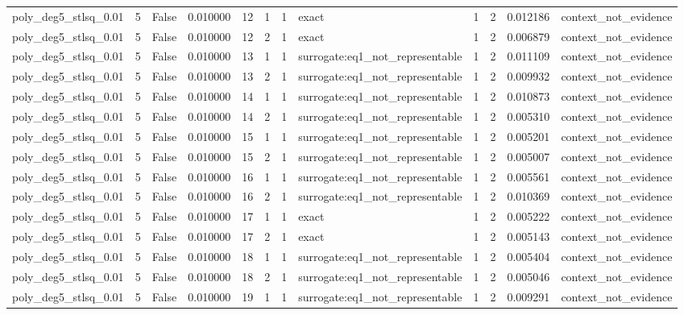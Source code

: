\begin{tabular}{lrrrrrrlrrrl}
poly\_deg5\_stlsq\_0.01 & 5 & False & 0.010000 & 12 & 1 & 1 & exact & 1 & 2 & 0.012186 & context\_not\_evidence \\
poly\_deg5\_stlsq\_0.01 & 5 & False & 0.010000 & 12 & 2 & 1 & exact & 1 & 2 & 0.006879 & context\_not\_evidence \\
poly\_deg5\_stlsq\_0.01 & 5 & False & 0.010000 & 13 & 1 & 1 & surrogate:eq1\_not\_representable & 1 & 2 & 0.011109 & context\_not\_evidence \\
poly\_deg5\_stlsq\_0.01 & 5 & False & 0.010000 & 13 & 2 & 1 & surrogate:eq1\_not\_representable & 1 & 2 & 0.009932 & context\_not\_evidence \\
poly\_deg5\_stlsq\_0.01 & 5 & False & 0.010000 & 14 & 1 & 1 & surrogate:eq1\_not\_representable & 1 & 2 & 0.010873 & context\_not\_evidence \\
poly\_deg5\_stlsq\_0.01 & 5 & False & 0.010000 & 14 & 2 & 1 & surrogate:eq1\_not\_representable & 1 & 2 & 0.005310 & context\_not\_evidence \\
poly\_deg5\_stlsq\_0.01 & 5 & False & 0.010000 & 15 & 1 & 1 & surrogate:eq1\_not\_representable & 1 & 2 & 0.005201 & context\_not\_evidence \\
poly\_deg5\_stlsq\_0.01 & 5 & False & 0.010000 & 15 & 2 & 1 & surrogate:eq1\_not\_representable & 1 & 2 & 0.005007 & context\_not\_evidence \\
poly\_deg5\_stlsq\_0.01 & 5 & False & 0.010000 & 16 & 1 & 1 & surrogate:eq1\_not\_representable & 1 & 2 & 0.005561 & context\_not\_evidence \\
poly\_deg5\_stlsq\_0.01 & 5 & False & 0.010000 & 16 & 2 & 1 & surrogate:eq1\_not\_representable & 1 & 2 & 0.010369 & context\_not\_evidence \\
poly\_deg5\_stlsq\_0.01 & 5 & False & 0.010000 & 17 & 1 & 1 & exact & 1 & 2 & 0.005222 & context\_not\_evidence \\
poly\_deg5\_stlsq\_0.01 & 5 & False & 0.010000 & 17 & 2 & 1 & exact & 1 & 2 & 0.005143 & context\_not\_evidence \\
poly\_deg5\_stlsq\_0.01 & 5 & False & 0.010000 & 18 & 1 & 1 & surrogate:eq1\_not\_representable & 1 & 2 & 0.005404 & context\_not\_evidence \\
poly\_deg5\_stlsq\_0.01 & 5 & False & 0.010000 & 18 & 2 & 1 & surrogate:eq1\_not\_representable & 1 & 2 & 0.005046 & context\_not\_evidence \\
poly\_deg5\_stlsq\_0.01 & 5 & False & 0.010000 & 19 & 1 & 1 & surrogate:eq1\_not\_representable & 1 & 2 & 0.009291 & context\_not\_evidence \\

\end{tabular}
